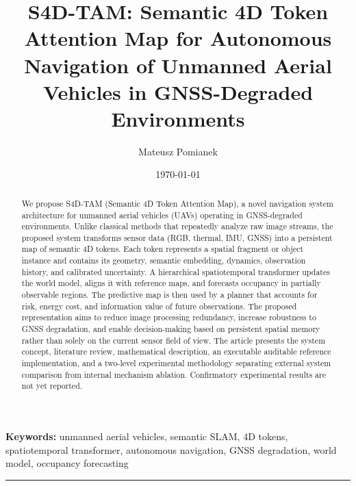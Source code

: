 \documentclass[10pt,a4paper]{article}
\title{\textbf{S4D-TAM: Semantic 4D Token Attention Map for Autonomous Navigation of Unmanned Aerial Vehicles in GNSS-Degraded Environments}}
\author{Mateusz Pomianek}
\affil{Department of Computer and Control Engineering, Rzeszów University of Technology, Poland\\
\texttt{m.pomianek@prz.edu.pl}}
\date{\today}
\begin{document}
\maketitle

\begin{abstract}
We propose S4D-TAM (Semantic 4D Token Attention Map), a novel navigation system architecture for unmanned aerial vehicles (UAVs) operating in GNSS-degraded environments. Unlike classical methods that repeatedly analyze raw image streams, the proposed system transforms sensor data (RGB, thermal, IMU, GNSS) into a persistent map of semantic 4D tokens. Each token represents a spatial fragment or object instance and contains its geometry, semantic embedding, dynamics, observation history, and calibrated uncertainty. A hierarchical spatiotemporal transformer updates the world model, aligns it with reference maps, and forecasts occupancy in partially observable regions. The predictive map is then used by a planner that accounts for risk, energy cost, and information value of future observations. The proposed representation aims to reduce image processing redundancy, increase robustness to GNSS degradation, and enable decision-making based on persistent spatial memory rather than solely on the current sensor field of view. The article presents the system concept, literature review, mathematical description, an executable auditable reference implementation, and a two-level experimental methodology separating external system comparison from internal mechanism ablation. Confirmatory experimental results are not yet reported.
\end{abstract}

\textbf{Keywords:} unmanned aerial vehicles, semantic SLAM, 4D tokens, spatiotemporal transformer, autonomous navigation, GNSS degradation, world model, occupancy forecasting

\vspace{1em}
\hrule
\vspace{1em}














\end{document}
